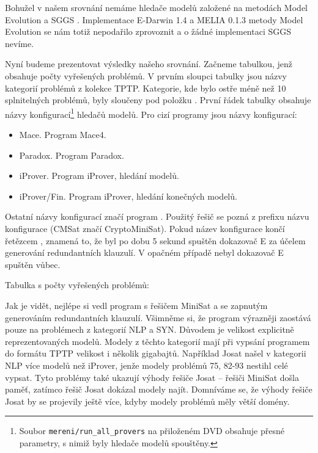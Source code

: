 Bohužel v našem srovnání nemáme hledače modelů
založené na metodách Model Evolution
a SGGS \cite{bonacina2015}.
Implementace E-Darwin 1.4 \cite{edarwin} a MELIA 0.1.3 \cite{melia}
metody Model Evolution se nám totiž nepodařilo zprovoznit
a o žádné implementaci SGGS nevíme.

\bigskip
Nyní budeme prezentovat výsledky našeho srovnání.
Začneme tabulkou, jenž obsahuje počty vyřešených problémů.
V prvním sloupci tabulky jsou názvy kategorií problémů
z kolekce TPTP. Kategorie, kde bylo ostře méně než 10
splnitelných problémů, byly sloučeny pod položku .
První řádek tabulky obsahuje názvy konfigurací\footnote{Soubor
\texttt{mereni/run\_all\_provers} na přiloženém DVD obsahuje
přesné parametry, s nimiž byly hledače modelů spouštěny.}
hledačů modelů. Pro cizí programy jsou názvy konfigurací:
\begin{itemize}
\item Mace. Program Mace4.
\item Paradox. Program Paradox.
\item iProver. Program iProver, hledání modelů.
\item iProver/Fin. Program iProver, hledání konečných modelů.
\end{itemize}
Ostatní názvy konfigurací značí program \crossbow{}.
Použitý řešič se pozná z prefixu názvu konfigurace (CMSat značí
CryptoMiniSat). Pokud název konfigurace končí řetězcem ,
znamená to, že byl po dobu 5 sekund spuštěn dokazovač E za účelem
generování redundantních klauzulí. V opačném případě nebyl dokazovač E
spuštěn vůbec.

\newcommand\summary[1]{\noindent
\begin{minipage}{1.0\textwidth}
\begin{center}

\end{center}
\end{minipage}}

\newpage

Tabulka s počty vyřešených problémů:

\summary{sum_counts}

Jak je vidět, nejlépe si vedl program \crossbow{} s řešičem MiniSat
a se zapnutým generováním redundantních klauzulí.
Všimněme si, že program \crossbow{} vý\-raz\-něji zaostává
pouze na problémech z kategorií NLP a SYN.
Důvodem je velikost explicitně reprezentovaných modelů. Modely z těchto
kategorií mají při vypsání programem \crossbow{} do formátu TPTP
velikost i několik gigabajtů. Například Josat našel
v kategorii NLP více modelů než iProver, jenže
modely problémů 75, 82-93 nestihl celé vypsat.
Tyto problémy také ukazují výhody řešiče Josat --
řešiči MiniSat došla paměť, zatímco řešič Josat dokázal modely najít.
Domníváme se, že výhody řešiče Josat by se projevily ještě více,
kdyby modely problémů měly větší domény.

